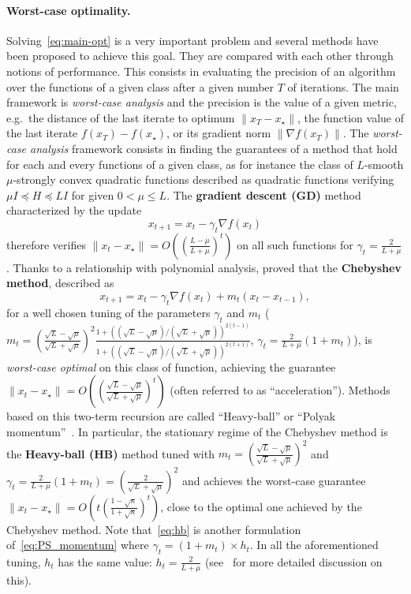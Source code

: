 \documentclass{article}
\newcommand{\xs}{x_\star}
\renewcommand{\leq}{\leqslant}
\renewcommand{\preceq}{\preccurlyeq}
\begin{document}
    \paragraph{Worst-case optimality.} Solving~\cref{eq:main-opt} is a very important problem and several methods have been proposed to achieve this goal.
    They are compared with each other through notions of performance.
    This consists in evaluating the precision of an algorithm over the functions of a given class after a given number $T$ of iterations.
    The main framework is \emph{worst-case analysis} and the precision is the value of a given metric, e.g.\ the distance of the last iterate to optimum $\|x_T-\xs\|$, the function value of the last iterate $f(x_T)-f(\xs)$, or its gradient norm $\|\nabla f(x_T)\|$.
    The \emph{worst-case analysis} framework consists in finding the guarantees of a method that hold for each and every functions of a given class, as for instance the class of $L$-smooth $\mu$-strongly convex quadratic functions described as quadratic functions verifying $\mu I \preceq H \preceq L I$ for given $0 < \mu \leq L$.
    The \textbf{gradient descent (GD)} method characterized by the update
    \begin{equation}
        x_{t+1} = x_t - \gamma_t \nabla f(x_t) \label{eq:gd}
    \end{equation}
    therefore verifies $\|x_{t} - \xs\| = O((\frac{L-\mu}{L+\mu})^{t})$ on all such functions for $\gamma_t = \frac{2}{L+\mu}$.
    Thanks to a relationship with polynomial analysis, \citet{golub1961chebyshev} proved that the \textbf{Chebyshev method}, described as
    \begin{equation}
        x_{t+1} = x_t - \gamma_t \nabla f(x_t) + m_t (x_t - x_{t-1}) \label{eq:hb},
    \end{equation}
    for a well chosen tuning of the parameters $\gamma_t$ and $m_t$ ($m_t = (\frac{\sqrt{L} - \sqrt{\mu}}{\sqrt{L} + \sqrt{\mu}})^2\frac{1 + ((\sqrt{L} - \sqrt{\mu})/(\sqrt{L} + \sqrt{\mu}))^{2(t-1)}}{1 + ((\sqrt{L} - \sqrt{\mu})/(\sqrt{L} + \sqrt{\mu}))^{2(t+1)}}$, $\gamma_t = \frac{2}{L+\mu}(1 + m_t)$), is \emph{worst-case optimal} on this class of function, achieving the guarantee $\|x_{t} - \xs\| = O((\frac{\sqrt{L}-\sqrt{\mu}}{\sqrt{L}+\sqrt{\mu}})^{t})$ (often referred to as ``acceleration'').
    Methods based on this two-term recursion are called ``Heavy-ball'' or ``Polyak momentum''~\citep{polyak1964some}.
    In particular, the stationary regime of the Chebyshev method is the \textbf{Heavy-ball (HB)} method tuned with $m_t = (\frac{\sqrt{L}-\sqrt{\mu}}{\sqrt{L}+\sqrt{\mu}})^{2}$ and $\gamma_t = \frac{2}{L+\mu}(1 + m_t) = (\frac{2}{\sqrt{L} + \sqrt{\mu}})^2$ and achieves the worst-case guarantee
    $\|x_{t} - \xs\| = O( t (\frac{1-\sqrt{\kappa}}{1+\sqrt{\kappa}})^{t})$, close to the optimal one achieved by the Chebyshev method.
    Note that~\cref{eq:hb} is another formulation of~\cref{eq:PS_momentum} where $\gamma_t = (1 + m_t) \times h_t$.
    In all the aforementioned tuning, $h_t$ has the same value: $h_t = \frac{2}{L + \mu}$ (see~ for more detailed discussion on this).
\end{document}
